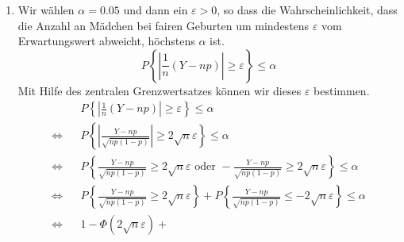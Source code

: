 \documentclass[a4paper]{scrartcl}
\newcommand{\gdw}{\Leftrightarrow}
\begin{document}
\begin{enumerate}[label=\bfseries\arabic*.]
\begin{enumerate}[label=(\alph*)]
            \item
                Wir wählen $\alpha = \num{0,05}$ und dann ein $\varepsilon > 0$,
                so dass die Wahrscheinlichkeit, dass die Anzahl an Mädchen bei
                fairen Geburten um mindestens $\varepsilon$ vom Erwartungswert
                abweicht, höchstens $\alpha$ ist.
                \begin{equation*}
                    P \left\{
                        \left| \frac{1}{n} (Y - np) \right| \geq \varepsilon
                    \right\} \leq \alpha
                \end{equation*}
                Mit Hilfe des zentralen Grenzwertsatzes können wir dieses
                $\varepsilon$ bestimmen.
                \begin{equation*}
                    \begin{alignedat}{2}
                        && P \left\{
                            \left| \frac{1}{n} (Y - np) \right| \geq \varepsilon
                        \right\} 
                        \leq \alpha \\
                        \gdw&& P \left\{
                            \left| \frac{Y - np}{\sqrt{np(1-p)}} \right|
                            \geq 2 \sqrt{n} \varepsilon
                        \right\} 
                        \leq \alpha \\
                        \gdw&& P \left\{
                            \frac{Y - np}{\sqrt{np(1-p)}}
                            \geq 2 \sqrt{n} \varepsilon
                            \text{ oder }
                            -\frac{Y - np}{\sqrt{np(1-p)}}
                            \geq 2 \sqrt{n} \varepsilon
                        \right\} 
                        \leq \alpha \\
                        \gdw&& P \left\{
                            \frac{Y - np}{\sqrt{np(1-p)}}
                            \geq 2 \sqrt{n} \varepsilon
                        \right\} 
                        +
                        P \left\{
                            \frac{Y - np}{\sqrt{np(1-p)}}
                            \leq -2 \sqrt{n} \varepsilon
                        \right\} 
                        \leq \alpha \\
                        \gdw&&
                        1 - \Phi(2 \sqrt{n} \varepsilon)
                        +

\end{alignedat}
\end{equation*}
\end{enumerate}
\end{enumerate}
\end{document}

